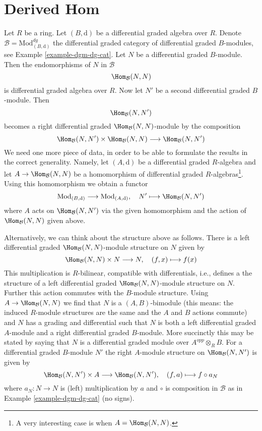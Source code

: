 \section{Derived Hom}
\label{section-restriction}

\noindent
Let $R$ be a ring. Let $(B, \text{d})$ be a differential graded algebra
over $R$. Denote $\mathcal{B} = \text{Mod}^{dg}_{(B, \text{d})}$
the differential graded category of differential graded $B$-modules, see
Example \ref{example-dgm-dg-cat}. Let $N$ be a differential graded $B$-module.
Then the endomorphisms of $N$ in $\mathcal{B}$
$$
\Hom_\mathcal{B}(N, N)
$$
is differential graded algebra over $R$. Now let $N'$ be a second differential
graded $B$-module. Then
$$
\Hom_\mathcal{B}(N, N')
$$
becomes a right differential graded $\Hom_\mathcal{B}(N, N)$-module by the
composition
$$
\Hom_\mathcal{B}(N, N') \times \Hom_\mathcal{B}(N, N)
\longrightarrow
\Hom_\mathcal{B}(N, N')
$$
We need one more piece of data, in order to be able to formulate the
results in the correct generality. Namely, let $(A, \text{d})$ be a
differential graded $R$-algebra and let $A \to \Hom_\mathcal{B}(N, N)$
be a homomorphism of differential graded $R$-algebras\footnote{A very
interesting case is when $A = \Hom_\mathcal{B}(N, N)$.}. Using this
homomorphism we obtain a functor
\begin{equation}
\label{equation-restriction}
\text{Mod}_{(B, \text{d})}
\longrightarrow
\text{Mod}_{(A, \text{d})},\quad
N' \longmapsto \Hom_\mathcal{B}(N, N')
\end{equation}
where $A$ acts on $\Hom_\mathcal{B}(N, N')$ via the given homomorphism
and the action of $\Hom_\mathcal{B}(N, N)$ given above.

\medskip\noindent
Alternatively, we can think about the structure above as follows.
There is a left differential graded $\Hom_\mathcal{B}(N, N)$-module
structure on $N$ given by
$$
\Hom_\mathcal{B}(N, N) \times N \longrightarrow N,\quad
(f, x) \longmapsto f(x)
$$
This multiplication is $R$-bilinear, compatible with differentials,
i.e., defines a the structure of a left differential graded
$\Hom_\mathcal{B}(N, N)$-module structure on $N$. Further this
action commutes with the $B$-module structure. Using
$A \to \Hom_\mathcal{B}(N, N)$ we find that $N$ is a $(A, B)$-bimodule
(this means: the induced $R$-module structures are the same and
the $A$ and $B$ actions commute) and $N$ has a grading and differential
such that $N$ is both a left differential graded $A$-module and
a right differential graded $B$-module. More succinctly this may
be stated by saying that $N$ is a differential graded module
over $A^{opp} \otimes_R B$. For a differential graded $B$-module $N'$
the right $A$-module structure on $\Hom_\mathcal{B}(N, N')$ is given by
$$
\Hom_\mathcal{B}(N, N') \times A \longrightarrow \Hom_\mathcal{B}(N, N'),\quad
(f, a) \longmapsto f \circ a_N
$$
where $a_N : N \to N$ is (left) multiplication by $a$ and $\circ$ is
composition in $\mathcal{B}$ as in Example \ref{example-dgm-dg-cat}
(no signs).

